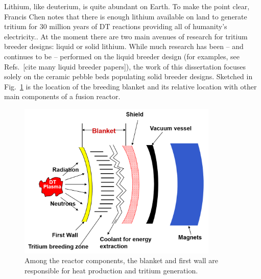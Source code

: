 Lithium, like deuterium, is quite abundant on Earth. To make the point clear, Francis Chen notes that there is enough lithium available on land to generate tritium for 30 million years of DT reactions providing all of humanity's electricity.\cite{Chen2011}. At the moment there are two main avenues of research for tritium breeder designs: liquid or solid lithium. While much research has been -- and continues to be -- performed on the liquid breeder design (for examples, see Refs.~[cite many liquid breeder papers]), the work of this dissertation focuses solely on the ceramic pebble beds populating solid breeder designs. Sketched in Fig.~\ref{fig:reactor-components} is the location of the breeding blanket and its relative location with other main components of a fusion reactor. 


\begin{figure}
	\centering
	\includegraphics[width=0.85\textwidth]{chapters/figures/reactor_components.png} 
	\caption{Among the reactor components, the blanket and first wall are responsible for heat production and tritium generation.}
	\label{fig:reactor-components}
\end{figure}

